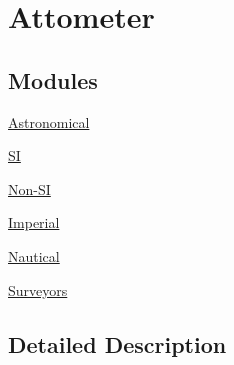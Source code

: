 \hypertarget{group___e_g_x_math-_conversions-_length_conversions-_attometer}{}\section{Attometer}
\label{group___e_g_x_math-_conversions-_length_conversions-_attometer}
\subsection*{Modules}
\begin{DoxyCompactItemize}
\item 
\mbox{\hyperlink{group___e_g_x_math-_conversions-_length_conversions-_attometer-_astronomical}{Astronomical}}
\item 
\mbox{\hyperlink{group___e_g_x_math-_conversions-_length_conversions-_attometer-_s_i}{SI}}
\item 
\mbox{\hyperlink{group___e_g_x_math-_conversions-_length_conversions-_attometer-_non-_s_i}{Non-\/\+SI}}
\item 
\mbox{\hyperlink{group___e_g_x_math-_conversions-_length_conversions-_attometer-_imperial}{Imperial}}
\item 
\mbox{\hyperlink{group___e_g_x_math-_conversions-_length_conversions-_attometer-_nautical}{Nautical}}
\item 
\mbox{\hyperlink{group___e_g_x_math-_conversions-_length_conversions-_attometer-_surveyors}{Surveyors}}
\end{DoxyCompactItemize}


\subsection{Detailed Description}
